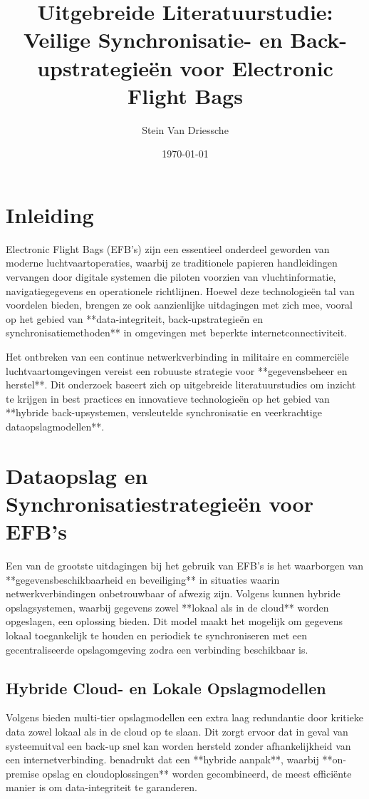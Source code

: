 \documentclass{hogent-article}
\title{Uitgebreide Literatuurstudie: Veilige Synchronisatie- en Back-upstrategieën voor Electronic Flight Bags}
\author{Stein Van Driessche}
\date{\today}
\begin{document}
    
    \maketitle
    
    \section{Inleiding}
    
    Electronic Flight Bags (EFB’s) zijn een essentieel onderdeel geworden van moderne luchtvaartoperaties, waarbij ze traditionele papieren handleidingen vervangen door digitale systemen die piloten voorzien van vluchtinformatie, navigatiegegevens en operationele richtlijnen. Hoewel deze technologieën tal van voordelen bieden, brengen ze ook aanzienlijke uitdagingen met zich mee, vooral op het gebied van **data-integriteit, back-upstrategieën en synchronisatiemethoden** in omgevingen met beperkte internetconnectiviteit.
    
    Het ontbreken van een continue netwerkverbinding in militaire en commerciële luchtvaartomgevingen vereist een robuuste strategie voor **gegevensbeheer en herstel**. Dit onderzoek baseert zich op uitgebreide literatuurstudies om inzicht te krijgen in best practices en innovatieve technologieën op het gebied van **hybride back-upsystemen, versleutelde synchronisatie en veerkrachtige dataopslagmodellen**.
    
    \section{Dataopslag en Synchronisatiestrategieën voor EFB’s}
    
    Een van de grootste uitdagingen bij het gebruik van EFB’s is het waarborgen van **gegevensbeschikbaarheid en beveiliging** in situaties waarin netwerkverbindingen onbetrouwbaar of afwezig zijn. Volgens \textcite{Yanamala2024} kunnen hybride opslagsystemen, waarbij gegevens zowel **lokaal als in de cloud** worden opgeslagen, een oplossing bieden. Dit model maakt het mogelijk om gegevens lokaal toegankelijk te houden en periodiek te synchroniseren met een gecentraliseerde opslagomgeving zodra een verbinding beschikbaar is.
    
    \subsection{Hybride Cloud- en Lokale Opslagmodellen}
    
    Volgens \textcite{AWSBackup} bieden multi-tier opslagmodellen een extra laag redundantie door kritieke data zowel lokaal als in de cloud op te slaan. Dit zorgt ervoor dat in geval van systeemuitval een back-up snel kan worden hersteld zonder afhankelijkheid van een internetverbinding. \textcite{MicrosoftBackup} benadrukt dat een **hybride aanpak**, waarbij **on-premise opslag en cloudoplossingen** worden gecombineerd, de meest efficiënte manier is om data-integriteit te garanderen.
    
\end{document}
